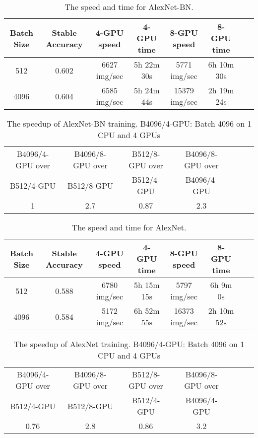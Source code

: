 \documentclass{article} %
\begin{document}
 \begin{table}[tb]
  \caption{The speed and time for AlexNet-BN.}
  \label{tab:alexnet_bn_speed}
\centering
    \vspace{3pt}
  \begin{tabular}{|c|c|cc|cc|cc}
  \hline
  Batch Size & Stable Accuracy & 4-GPU speed & 4-GPU time & 8-GPU speed & 8-GPU time\\
    \hline
    \hline
   512 & 0.602 & 6627 img/sec & 5h 22m 30s & 5771 img/sec & 6h 10m 30s\\
   \hline
   4096 & 0.604 & 6585 img/sec & 5h 24m 44s & 15379 img/sec & 2h 19m 24s\\
   \hline
  \end{tabular}
\end{table}

 \begin{table}[tb]
  \caption{The speedup of AlexNet-BN training. B4096/4-GPU: Batch 4096 on 1 CPU and 4 GPUs}
  \label{tab:alexnet_bn_speedup}
\centering
    \vspace{3pt}
  \begin{tabular}{|c|c|c|c|c|cc}
  \hline
  B4096/4-GPU over & B4096/8-GPU over & B512/8-GPU over & B4096/8-GPU over \\
  B512/4-GPU & B512/8-GPU & B512/4-GPU & B4096/4-GPU\\
    \hline
   1 & 2.7 & 0.87 & 2.3\\
   \hline
  \end{tabular}
\end{table}


 \begin{table}[tb]
  \caption{The speed and time for AlexNet.}
  \label{tab:alexnet_speed}
\centering
    \vspace{3pt}
  \begin{tabular}{|c|c|cc|cc|cc}
  \hline
  Batch Size & Stable Accuracy & 4-GPU speed & 4-GPU time & 8-GPU speed & 8-GPU time\\
    \hline
    \hline
   512 & 0.588 & 6780 img/sec & 5h 15m 15s & 5797 img/sec & 6h 9m 0s\\
   \hline
   4096 & 0.584 & 5172 img/sec & 6h 52m 55s & 16373 img/sec & 2h 10m 52s\\
   \hline
  \end{tabular}
\end{table}

 \begin{table}[tb]
  \caption{The speedup of AlexNet training. B4096/4-GPU: Batch 4096 on 1 CPU and 4 GPUs}
  \label{tab:alexnet_speedup}
\centering
    \vspace{3pt}
  \begin{tabular}{|c|c|c|c|c|cc}
  \hline
  B4096/4-GPU over & B4096/8-GPU over & B512/8-GPU over & B4096/8-GPU over \\
  B512/4-GPU & B512/8-GPU & B512/4-GPU & B4096/4-GPU\\
    \hline
   0.76 & 2.8 & 0.86 & 3.2\\
   \hline
  \end{tabular}
\end{table}
\end{document}
